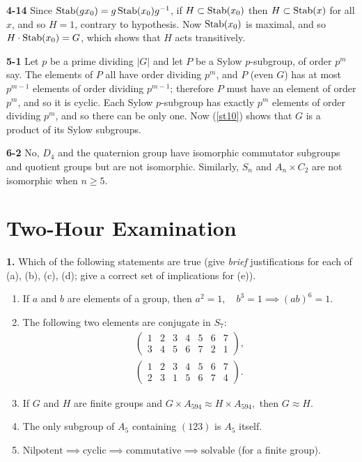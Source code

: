 \documentclass[a4paper,11pt,final,openany]{memoir}%
\theoremstyle{nonumberplain}
\begin{document}
\bigskip\noindent\textbf{4-14}
Since $\operatorname{Stab}(gx_{0})=g\operatorname{Stab}(x_{0})g^{-1}$, if $H\subset\operatorname{Stab}(x_{0})$ then
$H\subset\operatorname{Stab}(x)$ for all $x$, and so $H=1$, contrary to hypothesis. Now
$\operatorname{Stab}(x_{0})$ is maximal, and so $H\cdot\operatorname{Stab}(x_{0})=G$, which shows that $H$
acts transitively.

\bigskip\noindent\textbf{5-1}
Let $p$ be a prime dividing $|G|$ and let $P$ be a Sylow $p$-subgroup, of
order $p^{m}$ say. The elements of $P$ all have order dividing $p^{m}$, and $P$
(even $G$) has at most $p^{m-1}$ elements of order dividing $p^{m-1}$; therefore $P$ must have an element of
order $p^{m}$, and so it is cyclic. Each Sylow $p$-subgroup has exactly
$p^{m}$ elements of order dividing $p^{m}$, and so there can be only one. Now
(\ref{st10}) shows that $G$ is a product of its Sylow subgroups.

\bigskip\noindent\textbf{6-2}
No, $D_{4}$ and the quaternion group have isomorphic commutator subgroups and
quotient groups but are not isomorphic. Similarly, $S_{n}$ and $A_{n}\times
C_{2}$ are not isomorphic when $n\geq5$.



\clearpage


\clearpage


\chapter{Two-Hour Examination}

\noindent\textbf{1.} Which of the following statements are true (give
\textit{brief} justifications for each of (a), (b), (c), (d); give a correct
set of implications for (e)).

\begin{enumerate}
\item If $a$ and $b$ are elements of a group, then $a^{2}=1,\quad
b^{3}=1\implies(ab)^{6}=1$.

\item The following two elements are conjugate in $S_{7}$:
\begin{align*}%
\begin{pmatrix}
1 & 2 & 3 & 4 & 5 & 6 & 7\\
3 & 4 & 5 & 6 & 7 & 2 & 1
\end{pmatrix}
,\\%
\begin{pmatrix}
1 & 2 & 3 & 4 & 5 & 6 & 7\\
2 & 3 & 1 & 5 & 6 & 7 & 4
\end{pmatrix}
.
\end{align*}


\item If $G$ and $H$ are finite groups and $G\times A_{594}\approx H\times
A_{594},$ then $G\approx H$.

\item The only subgroup of $A_{5}$ containing $(123)$ is $A_{5}$ itself.

\item $\text{Nilpotent}\implies\text{cyclic}\implies\text{commutative}%
\implies\text{solvable}$ (for a finite group).
\end{enumerate}
\end{document}
